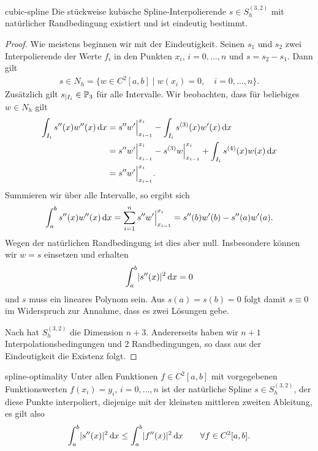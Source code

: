 \begin{Satz}{cubic-spline}
  Die stückweise kubische Spline-Interpolierende $s\in S_h^{(3,2)}$
  mit natürlicher Randbedingung existiert und ist eindeutig bestimmt.
\end{Satz}

\begin{proof}
  Wie meistens beginnen wir mit der Eindeutigkeit. Seinen $s_1$ und
  $s_2$ zwei Interpolierende der Werte $f_i$ in den Punkten $x_i$,
  $i=0,\dots,n$ und $s=s_2-s_1$. Dann gilt
  \begin{gather}
    \label{eq:splines:n}
    s \in N_h = \bigl\{ w\in C^2[a,b]
    \;\big|\; w(x_i) = 0, \quad i=0,\dots,n \bigr\}.
  \end{gather}
  Zusätzlich gilt $s_{| I_i}\in \P_3$ für alle Intervalle. Wir beobachten, dass für beliebiges $w\in N_h$ gilt
  \begin{align}
    \int_{I_i} s''(x) w''(x)\dx
    &= s''w'\Bigr|^{x_i}_{x_{i-1}} - \int_{I_i} s^{(3)}(x) w'(x)\dx\\
    &= s''w'\Bigr|^{x_i}_{x_{i-1}} - s^{(3)}w \Bigr|^{x_i}_{x_{i-1}}
      + \int_{I_i} s^{(4)}(x) w(x)\dx\\
    &= s''w'\Bigr|^{x_i}_{x_{i-1}}.
  \end{align}
  Summieren wir über alle Intervalle, so ergibt sich
  \begin{gather}
    \int_a^b s''(x) w''(x)\dx = \sum_{i=1}^n s''w'\Bigr|^{x_i}_{x_{i-1}}
    = s''(b) w'(b) - s''(a)w'(a).
  \end{gather}
  Wegen der natürlichen Randbedingung ist dies aber null. Insbesondere
  können wir $w=s$ einsetzen und erhalten
  \begin{gather}
    \int_a^b \abs{s''(x)}^2 \dx = 0
  \end{gather}
  und $s$ muss ein lineares Polynom sein. Aus $s(a) = s(b) = 0$ folgt
  damit $s\equiv 0$ im Widerspruch zur Annahme, dass es zwei Lösungen
  gebe.

  Nach  hat $S_h^{(3,2)}$ die Dimension
  $n+3$. Andererseits haben wir $n+1$ Interpolationsbedingungen und 2
  Randbedingungen, so dass aus der Eindeutigkeit die Existenz folgt.
\end{proof}

\begin{Lemma}{spline-optimality}
  Unter allen Funktionen $f\in C^2[a,b]$ mit vorgegebenen
  Funktionswerten $f(x_i) = y_i$, $i=0,\dots,n$ ist der natürliche
  Spline $s\in S_h^{(3,2)}$, der diese Punkte interpoliert, diejenige
  mit der kleinsten mittleren zweiten Ableitung, es gilt also
  \begin{gather}
    \int_a^b \abs{s''(x)}^2\dx \le \int_a^b \abs{f''(x)}^2 \dx
    \qquad \forall f\in C^2[a,b].
  \end{gather}
\end{Lemma}


